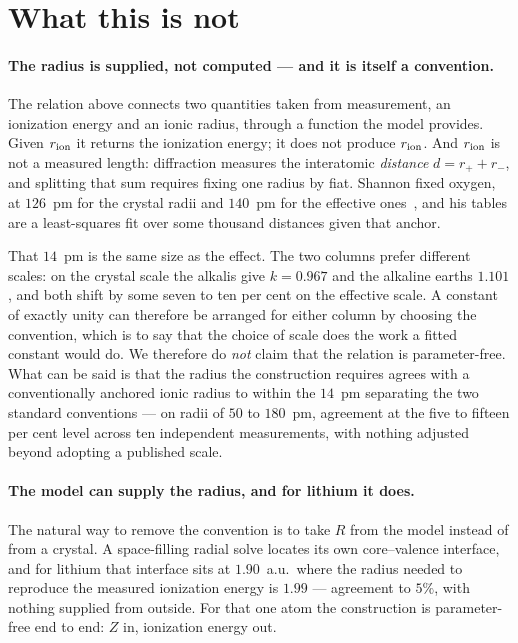 \documentclass[11pt]{article}
\begin{document}
\section{What this is not}\label{sec:limits}

\paragraph{The radius is supplied, not computed --- and it is itself a convention.} The
relation above connects two quantities taken from measurement, an ionization energy and an
ionic radius, through a function the model provides. Given $r_{\rm ion}$ it returns the
ionization energy; it does not produce $r_{\rm ion}$. And $r_{\rm ion}$ is not a measured
length: diffraction measures the interatomic \emph{distance} $d = r_+ + r_-$, and splitting
that sum requires fixing one radius by fiat. Shannon fixed oxygen, at $126$~pm for the crystal
radii and $140$~pm for the effective ones~\cite{Shannon1976}, and his tables are a
least-squares fit over some thousand distances given that anchor.

That $14$~pm is the same size as the effect. The two columns prefer different scales: on the
crystal scale the alkalis give $k=0.967$ and the alkaline earths $1.101$, and both shift by
some seven to ten per cent on the effective scale. A constant of exactly unity can
therefore be arranged for either column by choosing the convention, which is to say that the
choice of scale does the work a fitted constant would do. We therefore do \emph{not} claim
that the relation is parameter-free. What can be said is that the radius the construction
requires agrees with a conventionally anchored ionic radius to within the $14$~pm separating
the two standard conventions --- on radii of $50$ to $180$~pm, agreement at the five to fifteen
per cent level across ten independent measurements, with nothing adjusted beyond adopting a
published scale.

\paragraph{The model can supply the radius, and for lithium it does.} The natural way to
remove the convention is to take $R$ from the model instead of from a crystal. A space-filling
radial solve locates its own core--valence interface, and for lithium that interface sits at
$1.90$~a.u.\ where the radius needed to reproduce the measured ionization energy is $1.99$ ---
agreement to $5\%$, with nothing supplied from outside. For that one atom the construction is
parameter-free end to end: $Z$ in, ionization energy out.
\end{document}
